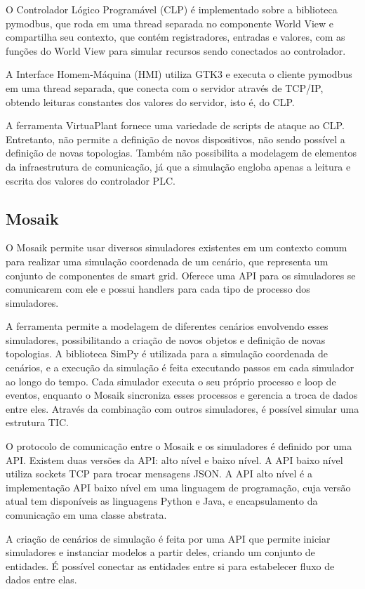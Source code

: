 \documentclass[cic,tc]{iiufrgs}
\begin{document}
O Controlador Lógico Programável (CLP) é implementado sobre a biblioteca pymodbus, que roda em uma thread separada no componente World View e compartilha seu contexto, que contém registradores, entradas e valores, com as funções do World View para simular recursos sendo conectados ao controlador.

A Interface Homem-Máquina (HMI) utiliza GTK3 e executa o cliente pymodbus em uma thread separada, que conecta com o servidor através de TCP/IP, obtendo leituras constantes dos valores do servidor, isto é, do CLP.

A ferramenta VirtuaPlant fornece uma variedade de scripts de ataque ao CLP. Entretanto, não permite a definição de novos dispositivos, não sendo possível a definição de novas topologias. Também não possibilita a modelagem de elementos da infraestrutura de comunicação, já que a simulação engloba apenas a leitura e escrita dos valores do controlador PLC.

\subsection{Mosaik}
O Mosaik \cite{mosaikwebsite} permite usar diversos simuladores existentes em um contexto comum para realizar uma simulação coordenada de um cenário, que representa um conjunto de componentes de smart grid. Oferece uma API para os simuladores se comunicarem com ele e possui handlers para cada tipo de processo dos simuladores.
	
A ferramenta permite a modelagem de diferentes cenários envolvendo esses simuladores, possibilitando a criação de novos objetos e definição de novas topologias. A biblioteca SimPy é utilizada para a simulação coordenada de cenários, e a execução da simulação é feita executando passos em cada simulador ao longo do tempo. Cada simulador executa o seu próprio processo e loop de eventos, enquanto o Mosaik sincroniza esses processos e gerencia a troca de dados entre eles. Através da combinação com outros simuladores, é possível simular uma estrutura TIC.

O protocolo de comunicação entre o Mosaik e os simuladores é definido por uma API. Existem duas versões da API: alto nível e baixo nível. A API baixo nível utiliza sockets TCP para trocar mensagens JSON. A API alto nível é a implementação API baixo nível em uma linguagem de programação, cuja versão atual tem disponíveis as linguagens Python e Java, e encapsulamento da comunicação em uma classe abstrata.

A criação de cenários de simulação é feita por uma API que permite iniciar simuladores e instanciar modelos a partir deles, criando um conjunto de entidades. É possível conectar as entidades entre si para estabelecer fluxo de dados entre elas.
\end{document}
